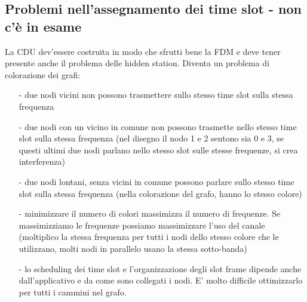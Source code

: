 \documentclass[12pt,italian]{report}
\begin{document}
\subsection{Problemi nell'assegnamento dei time slot - non c'è in esame}
La CDU dev'essere costruita in modo che sfrutti bene la FDM e deve tener presente anche il problema delle hidden station. Diventa un problema di colorazione dei grafi:
\begin{itemize}
    \item [-] due nodi vicini non possono trasmettere sullo stesso time slot sulla stessa frequenza 
    \item [-] due nodi con un vicino in comune non possono trasmette nello stesso time slot sulla stessa frequenza (nel disegno il nodo 1 e 2 sentono sia 0 e 3, se questi ultimi due nodi parlano nello stesso slot sulle stesse frequenze, si crea interferenza)
    \item [-] due nodi lontani, senza vicini in comune possono parlare sullo stesso time slot sulla stessa frequenza (nella colorazione del grafo, hanno lo stesso colore)
    \item [-] minimizzare il numero di colori massimizza il numero di frequenze. Se massimizziamo le frequenze possiamo massimizzare l'uso del canale (moltiplico la stessa frequenza per tutti i nodi dello stesso colore che le utilizzano, molti nodi in parallelo usano la stessa sotto-banda) 
    \item [-] lo scheduling dei time slot e l'organizzazione degli slot frame dipende anche dall'applicativo e da come sono collegati i nodi. E' molto difficile ottimizzarlo per tutti i cammini nel grafo. 
\end{itemize}
\end{document}
